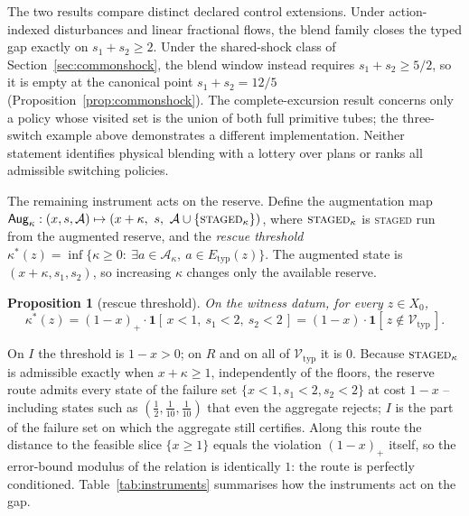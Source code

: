 \documentclass[preprint,11pt,authoryear]{elsarticle}
\newtheorem{proposition}{Proposition}
\theoremstyle{definition}
\theoremstyle{remark}
\newcommand{\Etyp}{E_{\mathrm{typ}}}
\newcommand{\Vtyp}{\mathcal{V}_{\mathrm{typ}}}
\newcommand{\act}[1]{\textsc{#1}}
\begin{document}
The two results compare distinct declared control extensions. Under action-indexed disturbances and linear fractional flows, the blend family closes the typed gap exactly on $s_1+s_2\ge2$. Under the shared-shock class of Section~\ref{sec:commonshock}, the blend window instead requires $s_1+s_2\ge5/2$, so it is empty at the canonical point $s_1+s_2=12/5$ (Proposition~\ref{prop:commonshock}). The complete-excursion result concerns only a policy whose visited set is the union of both full primitive tubes; the three-switch example above demonstrates a different implementation. Neither statement identifies physical blending with a lottery over plans or ranks all admissible switching policies.

The remaining instrument acts on the reserve. Define the augmentation map $\mathsf{Aug}_\kappa:(x,s,\mathcal A)\mapsto(x+\kappa,\ s,\ \mathcal A\cup\{\act{staged}_\kappa\})$, where $\act{staged}_\kappa$ is \act{staged} run from the augmented reserve, and the \emph{rescue threshold} $\kappa^*(z)=\inf\{\kappa\ge0:\ \exists a\in\mathcal A_\kappa,\ a\in\Etyp(z)\}$. The augmented state is $(x+\kappa,s_1,s_2)$, so increasing $\kappa$ changes only the available reserve.

\begin{proposition}[rescue threshold]\label{prop:rescue}
On the witness datum, for every $z\in X_0$,
\[
\kappa^*(z)=(1-x)_+\cdot\mathbf 1[\,x<1,\ s_1<2,\ s_2<2\,]=(1-x)\cdot\mathbf 1[\,z\notin\Vtyp\,].
\]
\end{proposition}

On $I$ the threshold is $1-x>0$; on $R$ and on all of $\Vtyp$ it is $0$. Because $\act{staged}_\kappa$ is admissible exactly when $x+\kappa\ge1$, independently of the floors, the reserve route admits every state of the failure set $\{x<1,s_1<2,s_2<2\}$ at cost $1-x$ -- including states such as $(\tfrac12,\tfrac1{10},\tfrac1{10})$ that even the aggregate rejects; $I$ is the part of the failure set on which the aggregate still certifies. Along this route the distance to the feasible slice $\{x\ge1\}$ equals the violation $(1-x)_+$ itself, so the error-bound modulus \citep{Fabian2010} of the relation is identically $1$: the route is perfectly conditioned. Table~\ref{tab:instruments} summarises how the instruments act on the gap.
\end{document}
